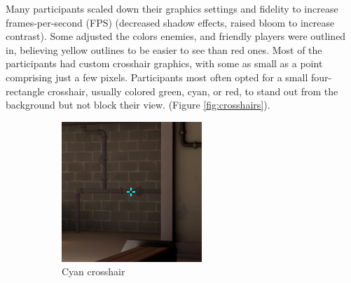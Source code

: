 \documentclass[11pt,manuscript,screen,review]{acmart} %
\begin{document}
Many participants scaled down their graphics settings and fidelity to increase frames-per-second (FPS) (decreased shadow effects, raised bloom to increase contrast). Some adjusted the colors enemies, and friendly players were outlined in, believing yellow outlines to be easier to see than red ones. Most of the participants had custom crosshair graphics, with some as small as a point comprising just a few pixels. Participants most often opted for a small four-rectangle crosshair, usually colored green, cyan, or red, to stand out from the background but not block their view. (Figure \ref{fig:crosshairs}). 

\begin{figure}[h]
    \centering
    \begin{subfigure}{0.3\linewidth}
        \includegraphics[width=\linewidth]{img/tenz-cyan.png}
        \caption{Cyan crosshair}
    \end{subfigure}
    \begin{subfigure}{0.3\linewidth}

\end{subfigure}
\end{figure}
\end{document}
